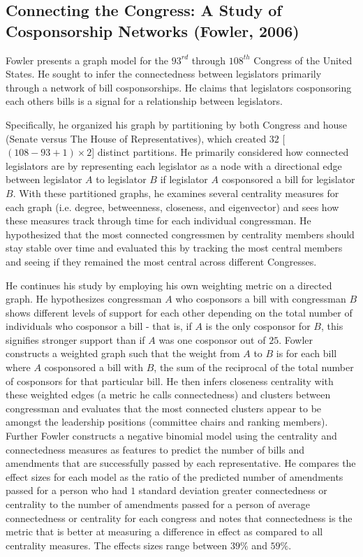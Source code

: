 \subsection{Connecting the Congress: A Study of Cosponsorship Networks (Fowler, 2006)}

Fowler presents a graph model for the $93^{rd}$ through $108^{th}$ Congress of the United 
States. He sought to infer the connectedness between legislators primarily 
through a network of bill cosponsorships. He claims that legislators 
cosponsoring each others bills is a signal for a relationship between legislators.

Specifically, he organized his graph by partitioning by both Congress and house 
(Senate versus The House of Representatives), which created $32$ 
[$(108 - 93 + 1) \times 2$] distinct partitions. He primarily considered how 
connected legislators are by representing each legislator as a node with a 
directional edge between legislator $A$ to legislator $B$ if legislator $A$ 
cosponsored a bill for legislator $B$. With these partitioned graphs, he 
examines several centrality measures for each graph (i.e. degree, betweenness, 
closeness, and eigenvector) and sees how these measures track through time for 
each individual congressman. He hypothesized that the most connected 
congressmen by centrality members should stay stable over time and evaluated 
this by tracking the most central members and seeing if they remained the 
most central across different Congresses.

He continues his study by employing his own weighting metric on a directed 
graph. He hypothesizes congressman $A$ who cosponsors a bill with congressman 
$B$ shows different levels of support for each other depending on the total 
number of individuals who cosponsor a bill - that is, if $A$ is the only 
cosponsor for $B$, this signifies stronger support than if $A$ was one 
cosponsor out of $25$. Fowler constructs a weighted graph such that the weight 
from $A$ to $B$ is for each bill where $A$ cosponsored a bill with $B$, the 
sum of the reciprocal of the total number of cosponsors for that particular 
bill. He then infers closeness centrality with these weighted edges (a metric 
he calls connectedness) and clusters between congressman and evaluates that the 
most connected clusters appear to be amongst the leadership positions 
(committee chairs and ranking members). Further Fowler constructs a negative 
binomial model using the centrality and connectedness measures as features to 
predict the number of bills and amendments that are successfully passed by each 
representative. He compares the effect sizes for each model as the ratio of the 
predicted number of amendments passed for a person who had $1$ standard 
deviation greater connectedness or centrality to the  number of amendments 
passed for a person of average connectedness or centrality for each congress 
and notes that connectedness is the metric that is better at measuring a 
difference in effect as compared to all centrality measures. The effects sizes 
range between $39\%$ and $59\%$.

